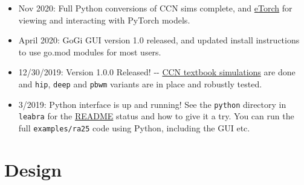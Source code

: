 \begin{itemize}
\item
  Nov 2020: Full Python conversions of CCN sims complete, and
  \href{https://github.com/emer/etorch}{eTorch} for viewing and
  interacting with PyTorch models.
\item
  April 2020: GoGi GUI version 1.0 released, and updated install
  instructions to use go.mod modules for most users.
\item
  12/30/2019: Version 1.0.0 Released! -\/-
  \href{https://github.com/CompCogNeuro/sims}{CCN textbook simulations}
  are done and \texttt{hip}, \texttt{deep} and \texttt{pbwm} variants
  are in place and robustly tested.
\item
  3/2019: Python interface is up and running! See the \texttt{python}
  directory in \texttt{leabra} for the
  \href{https://github.com/emer/leabra/blob/master/python/README.md}{README}
  status and how to give it a try. You can run the full
  \texttt{examples/ra25} code using Python, including the GUI etc.
\end{itemize}

\hypertarget{design}{%
\section{Design}\label{design}}

